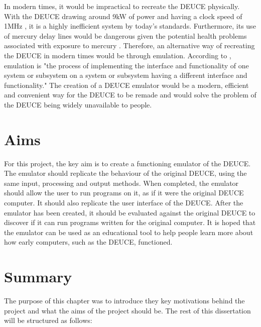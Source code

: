 \documentclass{l4proj}
\begin{document}
In modern times, it would be impractical to recreate the DEUCE physically. With the DEUCE drawing around 9kW of power and having a clock speed of 1MHz \citep{Glasgow60}, it is a highly inefficient system by today's standards. Furthermore, its use of mercury delay lines would be dangerous given the potential health problems associated with exposure to mercury \citep{Gao17}. Therefore, an alternative way of recreating the DEUCE in modern times would be through emulation. According to \citet{Nair05}, emulation is "the process of implementing the interface and functionality of one system or subsystem on a system or subsystem having a different interface and functionality." The creation of a DEUCE emulator would be a modern, efficient and convenient way for the DEUCE to be remade and would solve the problem of the DEUCE being widely unavailable to people.

\section{Aims}

For this project, the key aim is to create a functioning emulator of the DEUCE. The emulator should replicate the behaviour of the original DEUCE, using the same input, processing and output methods. When completed, the emulator should allow the user to run programs on it, as if it were the original DEUCE computer. It should also replicate the user interface of the DEUCE. After the emulator has been created, it should be evaluated against the original DEUCE to discover if it can run programs written for the original computer. It is hoped that the emulator can be used as an educational tool to help people learn more about how early computers, such as the DEUCE, functioned.

\section{Summary}

The purpose of this chapter was to introduce they key motivations behind the project and what the aims of the project should be. The rest of this dissertation will be structured as follows:
\end{document}
